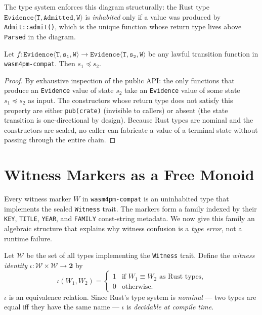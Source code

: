 The type system enforces this diagram structurally: the Rust type
$\mathtt{Evidence\langle T, Admitted, W\rangle}$ is \emph{inhabited} only
if a value was produced by \texttt{Admit::admit()}, which is the unique
function whose return type lives above \texttt{Parsed} in the diagram.

\begin{theorem}
Let $f : \mathtt{Evidence\langle T, s_1, W\rangle} \to
\mathtt{Evidence\langle T, s_2, W\rangle}$ be any lawful transition function
in \texttt{wasm4pm-compat}. Then $s_1 \preceq s_2$.
\end{theorem}

\begin{proof}
By exhaustive inspection of the public API: the only functions that produce an
\texttt{Evidence} value of state $s_2$ take an \texttt{Evidence} value of some
state $s_1 \preceq s_2$ as input. The constructors whose return type does not
satisfy this property are either \texttt{pub(crate)} (invisible to callers) or
absent (the state transition is one-directional by design). Because Rust types
are nominal and the constructors are sealed, no caller can fabricate a value of
a terminal state without passing through the entire chain.
\end{proof}

\section{Witness Markers as a Free Monoid}
\label{sec:conc-monoid}

Every witness marker $W$ in \texttt{wasm4pm-compat} is an uninhabited type
that implements the sealed \texttt{Witness} trait. The markers form a
family indexed by their \texttt{KEY}, \texttt{TITLE}, \texttt{YEAR}, and
\texttt{FAMILY} const-string metadata. We now give this family an algebraic
structure that explains why witness confusion is a \emph{type error}, not a
runtime failure.

\begin{definition}
Let $\mathcal{W}$ be the set of all types implementing the \texttt{Witness}
trait. Define the \emph{witness identity} $\iota : \mathcal{W} \times \mathcal{W}
\to \mathbf{2}$ by
\[
  \iota(W_1, W_2) = \begin{cases} 1 & \text{if } W_1 \equiv W_2 \text{ as Rust
  types,} \\ 0 & \text{otherwise.}\end{cases}
\]
$\iota$ is an equivalence relation. Since Rust's type system is
\emph{nominal} --- two types are equal iff they have the same name --- $\iota$ is
\emph{decidable at compile time}.
\end{definition}

